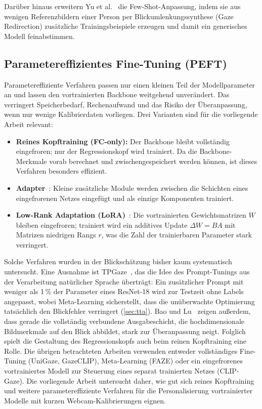 \documentclass[
  11pt,
  a4paper,
  oneside,
  DIV=12,                 %
  BCOR=8mm,               %
  parskip=half,           %
  headings=normal,
  bibliography=totoc,     %
  listof=totoc            %
]{scrreprt}
\begin{document}
Darüber hinaus erweitern Yu et al.~\cite{yu2019redirection} die Few-Shot-Anpassung, indem sie aus wenigen Referenzbildern einer Person per Blickumlenkungssynthese (Gaze Redirection) zusätzliche Trainingsbeispiele erzeugen und damit ein generisches Modell feinabstimmen.

\subsection{Parametereffizientes Fine-Tuning (PEFT)}
\label{subsec:peft}
Parametereffiziente Verfahren passen nur einen kleinen Teil der Modellparameter an und lassen den vortrainierten Backbone weitgehend unverändert. Das verringert Speicherbedarf, Rechenaufwand und das Risiko der Überanpassung, wenn nur wenige Kalibrierdaten vorliegen. Drei Varianten sind für die vorliegende Arbeit relevant:
\begin{itemize}
  \item \textbf{Reines Kopftraining (FC-only):} Der Backbone bleibt vollständig eingefroren; nur der Regressionskopf wird trainiert. Da die Backbone-Merkmale vorab berechnet und zwischengespeichert werden können, ist dieses Verfahren besonders effizient.
  \item \textbf{Adapter}~\cite{houlsby2019adapter}: Kleine zusätzliche Module werden zwischen die Schichten eines eingefrorenen Netzes eingefügt und als einzige Komponenten trainiert.
  \item \textbf{Low-Rank Adaptation (LoRA)}~\cite{hu2022lora}: Die vortrainierten Gewichtsmatrizen $W$ bleiben eingefroren; trainiert wird ein additives Update $\Delta W = BA$ mit Matrizen niedrigen Rangs $r$, was die Zahl der trainierbaren Parameter stark verringert.
\end{itemize}
Solche Verfahren wurden in der Blickschätzung bisher kaum systematisch untersucht. Eine Ausnahme ist TPGaze~\cite{liu2024tpgaze}, das die Idee des Prompt-Tunings aus der Verarbeitung natürlicher Sprache überträgt: Ein zusätzlicher Prompt mit weniger als 1\,\% der Parameter eines ResNet-18 wird zur Testzeit ohne Labels angepasst, wobei Meta-Learning sicherstellt, dass die unüberwachte Optimierung tatsächlich den Blickfehler verringert (\cref{sec:tta}). Bao und Lu~\cite{bao2024feature2gaze} zeigen außerdem, dass gerade die vollständig verbundene Ausgabeschicht, die hochdimensionale Bildmerkmale auf den Blick abbildet, stark zur Überanpassung neigt. Folglich spielt die Gestaltung des Regressionskopfs auch beim reinen Kopftraining eine Rolle. Die übrigen betrachteten Arbeiten verwenden entweder vollständiges Fine-Tuning (UniGaze, GazeCLIP), Meta-Learning (FAZE) oder ein eingefrorenes vortrainiertes Modell zur Steuerung eines separat trainierten Netzes (CLIP-Gaze). Die vorliegende Arbeit untersucht daher, wie gut sich reines Kopftraining und weitere parametereffiziente Verfahren für die Personalisierung vortrainierter Modelle mit kurzen Webcam-Kalibrierungen eignen.
\end{document}
